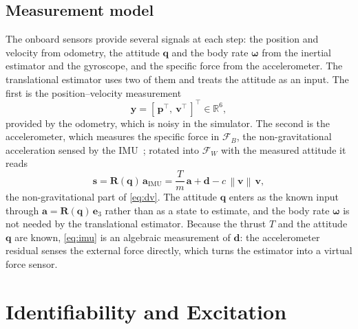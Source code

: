 \documentclass{ieeeaccess}
\newcommand{\R}{\mathbb{R}}
\newcommand{\norm}[1]{\left\| #1 \right\|}
\newcommand{\vect}[1]{\bm{#1}}
\newcommand{\mat}[1]{\mathbf{#1}}
\def\DIFaddbegin{\color{blue}}\def\DIFaddend{\color{black}}\def\DIFdelbegin{}\def\DIFdelend{} %
\begin{document}
\subsection{Measurement model}
The onboard sensors provide several signals at each step: the position and
velocity from odometry, the attitude $\vect{q}$ and the body rate
$\vect{\omega}$ from the inertial estimator and the gyroscope, and the specific
force from the accelerometer. The translational estimator uses two of them and
treats the attitude as an input. The first is the position--velocity
measurement
\begin{equation}
\vect{y} = [\,\vect{p}^{\!\top},\ \vect{v}^{\!\top}\,]^{\!\top}\in\R^6 ,
\label{eq:y}
\end{equation}
provided by the odometry, which is noisy in the simulator. The second is the
accelerometer, which measures the specific force in $\mathcal{F}_B$, the
non-gravitational acceleration sensed by the IMU~\cite{forster2015imu}; rotated into
$\mathcal{F}_W$ with the measured attitude it reads
\begin{equation}
\vect{s} = \mat{R}(\vect{q})\,\vect{a}_{\text{IMU}}
         = \frac{T}{m}\,\vect{a} + \vect{d} - c\,\norm{\vect{v}}\,\vect{v},
\label{eq:imu}
\end{equation}
the non-gravitational part of \eqref{eq:dv}. The attitude $\vect{q}$ enters as
the known input through $\vect{a}=\mat{R}(\vect{q})\,\vect{e}_3$ rather than as a
state to estimate, and the body rate $\vect{\omega}$ is not needed by the
translational estimator. Because the thrust $T$ and the attitude $\vect{q}$ are
known, \eqref{eq:imu} is an algebraic measurement of $\vect{d}$: the
accelerometer residual senses the external force directly, which turns the
estimator into a virtual force sensor.

\DIFdelbegin %
\DIFdelend %
\DIFaddbegin \section{Identifiability and Excitation}\DIFaddend \label{sec:obs}
\end{document}
